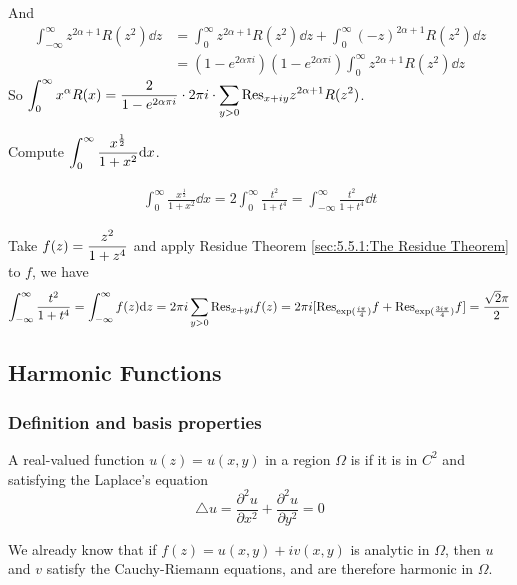 And 
\begin{equation*}
    \begin{aligned}
        \int_{-\infty}^\infty z^{2\alpha+1}R(z^2)\dd z&=\int_0^\infty z^{2\alpha+1}R(z^2)\dd z+\int_0^\infty(-z)^{2\alpha+1}R(z^2)\dd z\\
        &=(1-e^{2\alpha\pi i})(1-e^{2\alpha\pi i})\int_0^\infty z^{2\alpha+1}R(z^2)\dd z
    \end{aligned}
\end{equation*}
So  $ \displaystyle\int_0^\infty x^\alpha R(x)=\frac{2}{1-e^{2\alpha \pi i}}\cdot 2\pi i\cdot\sum_{y>0}\mathrm{Res}_{x+iy}z^{2\alpha+1}R(z^2) $.

\begin{example}
    Compute  $ \displaystyle\int_0^\infty\frac{x^{\frac{1}{2}}}{1+x^2}\mathrm{d} x $.
    
    
\begin{equation*}
    \begin{aligned}
        \int_0^\infty\frac{x^{\frac{1}{2}}}{1+x^2}\dd x=2\int_0^\infty\frac{t^2}{1+t^4}=\int_{-\infty}^\infty\frac{t^2}{1+t^4}\dd t
    \end{aligned}
\end{equation*}

Take  $ f(z)=\displaystyle\frac{z^2}{1+z^4} $ and apply Residue Theorem \ref{sec:5.5.1:The Residue Theorem} to  $ f $, we have 
\[\int_{-\infty}^\infty \frac{t^2}{1+t^4}=\int_{-\infty}^\infty f(z)\mathrm{d} z=2\pi i \sum_{y>0}\mathrm{Res}_{x+yi}f(z)=2\pi i[\mathrm{Res}_{\exp(\frac{i\pi   }{4})}f+\mathrm{Res}_{\exp(\frac{3i\pi}{4})}f]=\frac{\sqrt{2}\pi }{2}\] 
\end{example}

\subsection{Harmonic Functions}
\subsubsection{Definition and basis  properties}

A real-valued function  $ u(z)=u(x,y) $  in a region  $ \Omega  $ is  if it is in $ C^2 $ and satisfying the Laplace's equation
\begin{equation}
    \triangle u=\frac{\partial^2 u }{\partial x^2}+\frac{\partial^2 u}{\partial y^2}=0\label{Laplace's equation}
\end{equation}

We already know that if  $ f(z)=u(x,y)+iv(x,y) $ is analytic in  $ \Omega  $, then  $ u $ and  $ v  $ satisfy the Cauchy-Riemann equations, and are therefore harmonic in  $ \Omega $.

